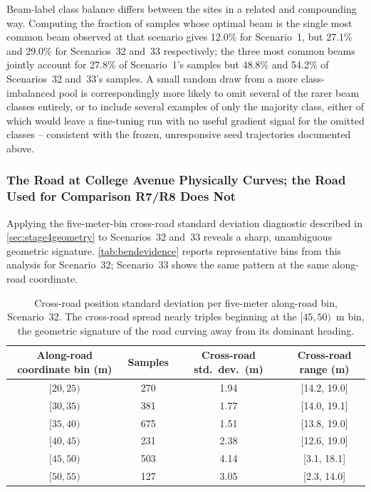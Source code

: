 \documentclass{iutbscthesis}
\begin{document}
Beam-label class balance differs between the sites in a related and compounding way. Computing the fraction of samples whose optimal beam is the single most common beam observed at that scenario gives 12.0\% for Scenario~1, but 27.1\% and 29.0\% for Scenarios~32 and~33 respectively; the three most common beams jointly account for 27.8\% of Scenario~1's samples but 48.8\% and 54.2\% of Scenarios~32 and~33's samples. A small random draw from a more class-imbalanced pool is correspondingly more likely to omit several of the rarer beam classes entirely, or to include several examples of only the majority class, either of which would leave a fine-tuning run with no useful gradient signal for the omitted classes -- consistent with the frozen, unresponsive seed trajectories documented above.

\subsubsection{The Road at College Avenue Physically Curves; the Road Used for Comparison R7/R8 Does Not}

Applying the five-meter-bin cross-road standard deviation diagnostic described in \autoref{sec:stage4geometry} to Scenarios~32 and~33 reveals a sharp, unambiguous geometric signature. \autoref{tab:bendevidence} reports representative bins from this analysis for Scenario~32; Scenario~33 shows the same pattern at the same along-road coordinate.

\begin{table}[H]
    \centering
    \begin{tabular}{c c c c}
        \toprule
        Along-road coordinate bin (m) & Samples & Cross-road std.\ dev.\ (m) & Cross-road range (m) \\
        \midrule
        $[20, 25)$ & 270 & 1.94 & [14.2, 19.0] \\
        $[30, 35)$ & 381 & 1.77 & [14.0, 19.1] \\
        $[35, 40)$ & 675 & 1.51 & [13.8, 19.0] \\
        $[40, 45)$ & 231 & 2.38 & [12.6, 19.0] \\
        $[45, 50)$ & 503 & 4.14 & [3.1, 18.1] \\
        $[50, 55)$ & 127 & 3.05 & [2.3, 14.0] \\
        \bottomrule
    \end{tabular}
    \caption{Cross-road position standard deviation per five-meter along-road bin, Scenario~32. The cross-road spread nearly triples beginning at the $[45,50)$~m bin, the geometric signature of the road curving away from its dominant heading.}
    \label{tab:bendevidence}
\end{table}
\end{document}
